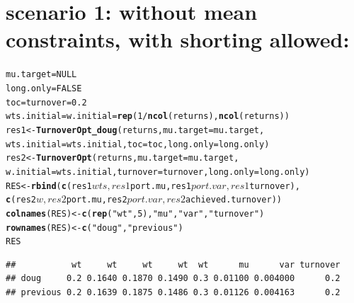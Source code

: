 \documentclass{uwstat518}\usepackage[]{graphicx}\usepackage[]{color}
\makeatletter
\newcommand{\hlstr}[1]{\textcolor[rgb]{0.192,0.494,0.8}{#1}}%
\newcommand{\hlkwd}[1]{\textcolor[rgb]{0.737,0.353,0.396}{\textbf{#1}}}%
\newenvironment{kframe}{%
 \def\at@end@of@kframe{}%
 \ifinner\ifhmode%
  \def\at@end@of@kframe{\end{minipage}}%
  \begin{minipage}{\columnwidth}%
 \fi\fi%
 \def\FrameCommand##1{\hskip\@totalleftmargin \hskip-\fboxsep
 \colorbox{shadecolor}{##1}\hskip-\fboxsep
     \hskip-\linewidth \hskip-\@totalleftmargin \hskip\columnwidth}%
 \MakeFramed {\advance\hsize-\width
   \@totalleftmargin\z@ \linewidth\hsize
   \@setminipage}}%
 {\par\unskip\endMakeFramed%
 \at@end@of@kframe}
\newenvironment{knitrout}{}{} %
\makeatother
\begin{document}
\section{scenario 1: without mean constraints, with shorting allowed:}
\begin{knitrout}
\color{fgcolor}\begin{kframe}
\begin{alltt}
mu.target = NULL
long.only = FALSE
toc=turnover=0.2
wts.initial=w.initial=\hlkwd{rep}(1/\hlkwd{ncol}(returns),\hlkwd{ncol}(returns))
res1 <- \hlkwd{TurnoverOpt_doug}(returns, mu.target =mu.target, 
		wts.initial = wts.initial, toc = toc,long.only=long.only)
res2 <- \hlkwd{TurnoverOpt}(returns,mu.target=mu.target, 
		w.initial=wts.initial,turnover=turnover,long.only=long.only)
RES <- \hlkwd{rbind}(\hlkwd{c}(res1$wts,res1$port.mu,res1$port.var,res1$turnover), 
		\hlkwd{c}(res2$w,res2$port.mu, res2$port.var, res2$achieved.turnover))
\hlkwd{colnames}(RES) <- \hlkwd{c}(\hlkwd{rep}(\hlstr{"wt"},5),\hlstr{"mu"},\hlstr{"var"},\hlstr{"turnover"})
\hlkwd{rownames}(RES) <- \hlkwd{c}(\hlstr{"doug"},\hlstr{"previous"})
RES	
\end{alltt}
\begin{verbatim}
##           wt     wt     wt     wt  wt      mu      var turnover
## doug     0.2 0.1640 0.1870 0.1490 0.3 0.01100 0.004000      0.2
## previous 0.2 0.1639 0.1875 0.1486 0.3 0.01126 0.004163      0.2
\end{verbatim}
\end{kframe}
\end{knitrout}
\end{document}
